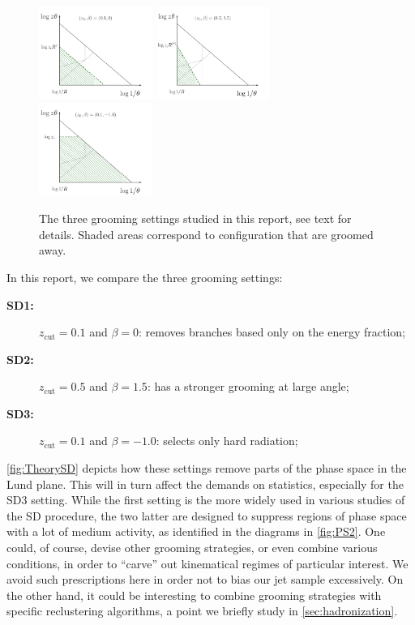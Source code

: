 \begin{figure}[t!]
\centering
\includegraphics[width=0.33\textwidth]{figures/kinematics/plotVac_SD2_2}%
\includegraphics[width=0.33\textwidth]{figures/kinematics/plotVac_SD1_2}%
\includegraphics[width=0.33\textwidth]{figures/kinematics/plotVac_SD3_2}%
\caption{The three grooming settings studied in this report, see text for details. Shaded areas correspond to configuration that are groomed away. }
\label{fig:TheorySD}
\end{figure}
In this report, we compare the three grooming settings:
\begin{description}
\item[{\bf SD1:}] $z_{\text{cut}}=0.1$ and $\beta=0$: removes branches based only on the energy fraction;
\item[{\bf SD2:}]  $z_{\text{cut}}=0.5$ and $\beta=1.5$: has a stronger grooming at large angle;
\item[{\bf SD3:}]  $z_{\text{cut}}=0.1$ and $\beta=-1.0$: selects only hard radiation;
\end{description}
\autoref{fig:TheorySD} depicts how these settings remove parts of the phase space in the Lund plane. This will in turn affect the demands on statistics, especially for the SD3 setting. While the first setting is the more widely used in various studies of the SD procedure, the two latter are designed to suppress regions of phase space with a lot of medium activity, as identified in the diagrams in \autoref{fig:PS2}. One could, of course, devise other grooming strategies, or even combine various conditions, in order to ``carve'' out kinematical regimes of particular interest. We avoid such prescriptions here in order not to bias our jet sample excessively. On the other hand, it could be interesting to combine grooming strategies with specific reclustering algorithms, a point we briefly study in \autoref{sec:hadronization}.

